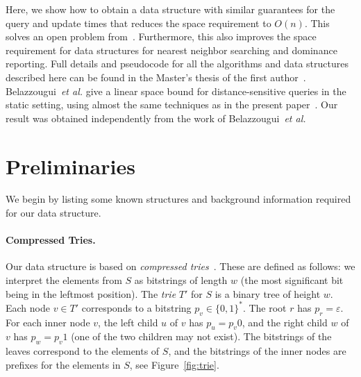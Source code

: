 \documentclass[a4paper,11pt]{article}
\newcommand{\eps}{\varepsilon}
\newcommand{\etal}{\emph{et al.}\xspace}
\newcommand{\?}{\mskip1.5mu}
\begin{document}
Here, we show how to obtain a data structure with similar
guarantees for the query and update times that reduces the
space requirement to $O(n)$. This solves an open problem 
from~\cite{BoseDoDuHoMo13}. Furthermore,  this also improves the space 
requirement for data structures for nearest neighbor searching
and dominance reporting.
Full details and pseudocode for all the algorithms and
data structures described here can 
be found in the Master's thesis of the first author~\cite{Ehrhardt15}.
Belazzougui~\etal give a linear space bound for distance-sensitive
queries in the static setting, using almost the same 
techniques as in the present paper~\cite{BelazzougiBoVi12}. Our 
result was obtained independently from the work of 
Belazzougui~\etal

\section{Preliminaries}
\label{sec:prelim}

We begin by listing some known structures and background information
required for our data structure.

\paragraph{Compressed Tries.}
Our data structure is based on \emph{compressed
tries}~\cite{CormenLeRiSt09}. These are defined as
follows: we interpret the elements from $S$ as bitstrings 
of length $w$ (the most significant bit being in the leftmost
position). The \emph{trie} $T'$ for $S$ is a binary tree
of height $w$. Each node $v \in T'$ corresponds
to a bitstring $p_v \in \{0,1\}^*$. The root $r$ has
$p_r = \eps$. For each inner node $v$, the left
child $u$ of $v$  has $p_u = p_v0$, and the
right child $w$ of $v$ has $p_w = p_v1$ (one of the
two children may not exist). The bitstrings of the 
leaves correspond to the elements of $S$, and
the bitstrings of the inner nodes are prefixes
for the elements in $S$, see Figure~\ref{fig:trie}.
\end{document}
